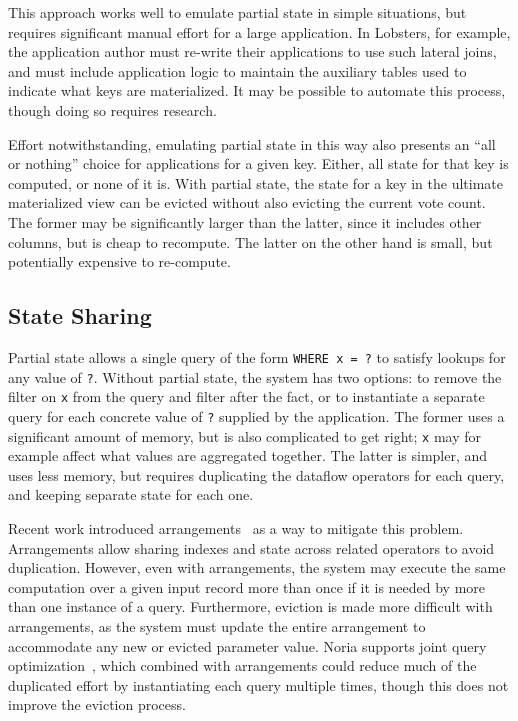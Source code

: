 This approach works well to emulate partial state in simple situations, but
requires significant manual effort for a large application. In Lobsters, for
example, the application author must re-write their applications to use such
lateral joins, and must include application logic to maintain the auxiliary
tables used to indicate what keys are materialized. It may be possible to
automate this process, though doing so requires research.

Effort notwithstanding, emulating partial state in this way also presents an
``all or nothing'' choice for applications for a given key. Either, all state
for that key is computed, or none of it is. With partial state, the state for a
key in the ultimate materialized view can be evicted without also evicting the
current vote count. The former may be significantly larger than the latter,
since it includes other columns, but is cheap to recompute. The latter on the
other hand is small, but potentially expensive to re-compute.

\subsection{State Sharing}

Partial state allows a single query of the form \texttt{WHERE x = ?} to satisfy
lookups for any value of \texttt{?}. Without partial state, the system has two
options: to remove the filter on \texttt{x} from the query and filter after the
fact, or to instantiate a separate query for each concrete value of \texttt{?}
supplied by the application. The former uses a significant amount of memory, but
is also complicated to get right; \texttt{x} may for example affect what values
are aggregated together. The latter is simpler, and uses less memory, but
requires duplicating the dataflow operators for each query, and keeping separate
state for each one.

Recent work introduced arrangements~\cite{arrangements} as a way to mitigate
this problem. Arrangements allow sharing indexes and state across related
operators to avoid duplication. However, even with arrangements, the system may
execute the same computation over a given input record more than once if it is
needed by more than one instance of a query. Furthermore, eviction is made more
difficult with arrangements, as the system must update the entire arrangement to
accommodate any new or evicted parameter value. Noria supports joint query
optimization~\cite{noria}, which combined with arrangements could reduce much of
the duplicated effort by instantiating each query multiple times, though this
does not improve the eviction process.

